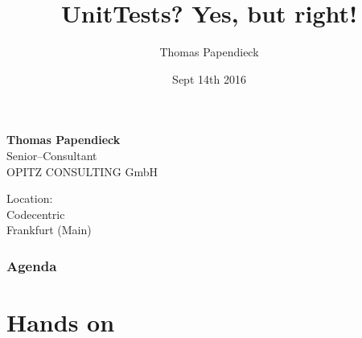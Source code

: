 \documentclass[aspectratio=169]{beamer}
\begin{document}
\title{UnitTests?  Yes, but right!}  
\author{Thomas Papendieck}
\date{Sept 14th 2016} 

\begin{frame}%

 
{ \textbf{Thomas Papendieck}\\Senior--Consultant\\\vspace{2em}OPITZ CONSULTING GmbH\vspace{2em}}

{{\small%
Location:\\}
Codecentric\\
Frankfurt (Main)
}
\end{frame}

\begin{frame}
\frametitle{Agenda}\tableofcontents
\end{frame} 


%







\section{Hands on}
\end{document}
